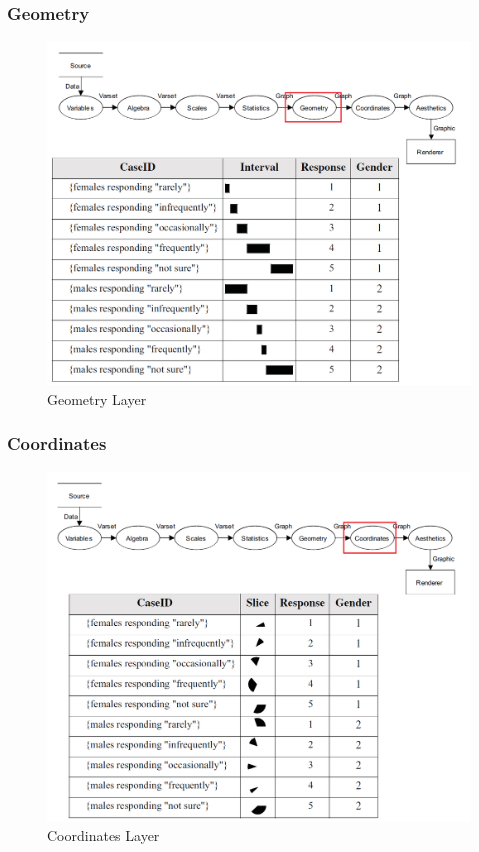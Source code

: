 \documentclass[12pt]{article}
\begin{document}
\subsubsection{Geometry}
\begin{figure}[h!]
\caption{Geometry Layer}
\includegraphics[width=\textwidth]{pic/pre5}
\end{figure}
\newpage
\subsubsection{Coordinates}
\begin{figure}[h!]
\caption{Coordinates Layer}
\includegraphics[width=\textwidth]{pic/pre6}
\end{figure}
\newpage
\end{document}
